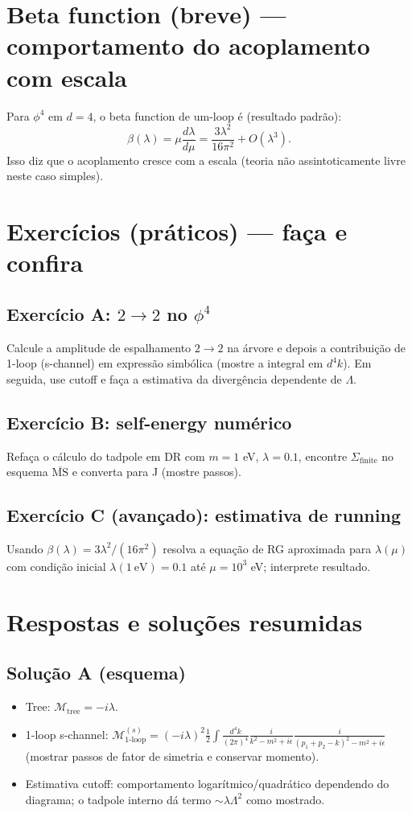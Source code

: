 \documentclass[12pt,a4paper]{article}
\begin{document}
\section{Beta function (breve) — comportamento do acoplamento com escala}
Para \(\phi^4\) em \(d=4\), o beta function de um-loop é (resultado padrão):
\begin{equation}
\beta(\lambda) = \mu \frac{d\lambda}{d\mu} = \frac{3\lambda^2}{16\pi^2} + O(\lambda^3).
\end{equation}
Isso diz que o acoplamento cresce com a escala (teoria não assintoticamente livre neste caso simples).

\section{Exercícios (práticos) — faça e confira}
\subsection{Exercício A: \(2\to2\) no \(\phi^4\)}
Calcule a amplitude de espalhamento \(2\to2\) na árvore e depois a contribuição de 1-loop (s-channel) em expressão simbólica (mostre a integral em \(d^4k\)). Em seguida, use cutoff e faça a estimativa da divergência dependente de \(\Lambda\).

\subsection{Exercício B: self-energy numérico}
Refaça o cálculo do tadpole em DR com \(m=1\) eV, \(\lambda=0.1\), encontre \(\Sigma_{\text{finite}}\) no esquema \(\overline{\text{MS}}\) e converta para J (mostre passos).

\subsection{Exercício C (avançado): estimativa de running}
Usando \(\beta(\lambda) = 3\lambda^2/(16\pi^2)\) resolva a equação de RG aproximada para \(\lambda(\mu)\) com condição inicial \(\lambda(1\ \mathrm{eV})=0.1\) até \(\mu=10^3\) eV; interprete resultado.

\section{Respostas e soluções resumidas}
\subsection{Solução A (esquema)}
\begin{itemize}
\item Tree: \(\mathcal{M}_{\text{tree}} = -i\lambda\).
\item 1-loop s-channel: \(\mathcal{M}_{1\text{-loop}}^{(s)} = (-i\lambda)^2 \frac{1}{2} \int \frac{d^4k}{(2\pi)^4} \frac{i}{k^2 - m^2 + i\epsilon} \frac{i}{(p_1+p_2-k)^2 - m^2 + i\epsilon}\) (mostrar passos de fator de simetria e conservar momento).
\item Estimativa cutoff: comportamento logarítmico/quadrático dependendo do diagrama; o tadpole interno dá termo \(\sim \lambda \Lambda^2\) como mostrado.
\end{itemize}
\end{document}
